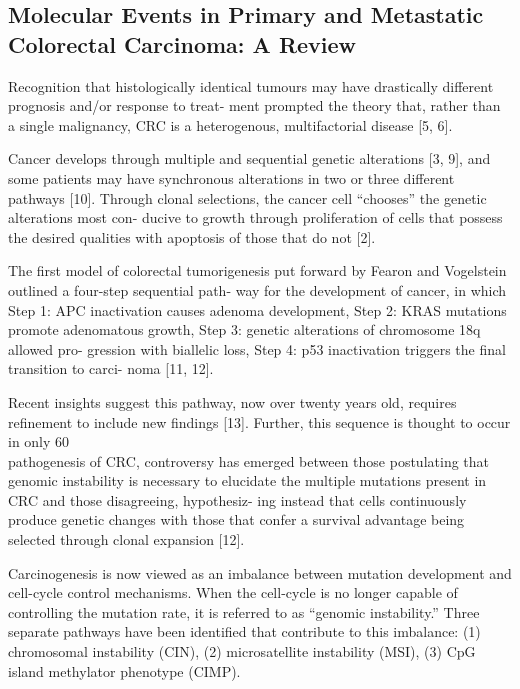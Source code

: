 \subsection{Molecular Events in Primary and Metastatic Colorectal Carcinoma: A Review}

  Recognition that histologically identical tumours may have drastically
  different prognosis and/or response to treat- ment prompted the theory that,
  rather than a single malignancy, CRC is a heterogenous, multifactorial
  disease [5, 6].

  Cancer develops through multiple and sequential genetic alterations [3, 9],
  and some patients may have synchronous alterations in two or three different
  pathways [10]. Through clonal selections, the cancer cell “chooses” the
  genetic alterations most con- ducive to growth through proliferation of cells
  that possess the desired qualities with apoptosis of those that do not [2].

  The first model of colorectal tumorigenesis put forward by Fearon and Vogelstein outlined a four-step sequential path- way for the development of cancer, in which
    Step 1: APC inactivation causes adenoma development,
    Step 2: KRAS mutations promote adenomatous growth,
    Step 3: genetic alterations of chromosome 18q allowed pro- gression with biallelic loss,
    Step 4: p53 inactivation triggers the final transition to carci- noma [11, 12].

  Recent insights suggest this pathway, now over twenty years old, requires
  refinement to include new findings [13]. Further, this sequence is thought to
  occur in only 60\\%
  pathogenesis of CRC, controversy has emerged between those postulating that
  genomic instability is necessary to elucidate the multiple mutations present
  in CRC and those disagreeing, hypothesiz- ing instead that cells continuously
  produce genetic changes with those that confer a survival advantage being
  selected through clonal expansion [12].

  Carcinogenesis is now viewed as an imbalance between mutation development and
  cell-cycle control mechanisms. When the cell-cycle is no longer capable of
  controlling the mutation rate, it is referred to as “genomic instability.”
  Three separate pathways have been identified that contribute to this
  imbalance:
    (1) chromosomal instability (CIN),
    (2) microsatellite instability (MSI),
    (3) CpG island methylator phenotype (CIMP).

